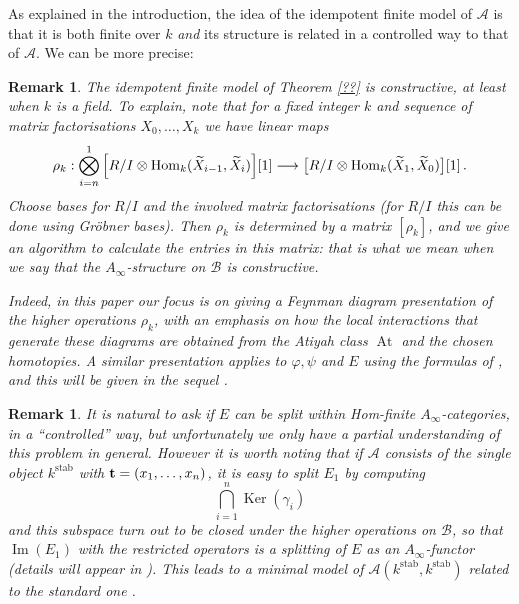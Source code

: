 \documentclass[english,letter paper,12pt,leqno]{article}
\theoremstyle{example}
\newtheorem{remark}[theorem]{Remark}
\numberwithin{equation}{section}
\def\AA{\mathcal{A}}
\def\BB{\mathcal{B}}
\def\Ker{\operatorname{Ker}}
\def\stab{\operatorname{stab}}
\def\Hom{\operatorname{Hom}}
\DeclareMathOperator{\vAt}{At}
\begin{document}
As explained in the introduction, the idea of the idempotent finite model of $\AA$ is that it is both finite over $k$ \emph{and} its structure is related in a controlled way to that of $\AA$. We can be more precise:

\begin{remark}
The idempotent finite model of Theorem \ref{??} is constructive, at least when $k$ is a field. To explain, note that for a fixed integer $k$ and sequence of matrix factorisations $X_0,\ldots,X_k$ we have linear maps
\[
\rho_k: \bigotimes_{i=n}^1 \Big[ R/I \otimes \Hom_k(\widetilde{X}_{i-1}, \widetilde{X}_i) \Big][1] \lto \big[ R/I \otimes \Hom_k( \widetilde{X}_1, \widetilde{X}_0 ) \big][1]\,.
\]
Choose bases for $R/I$ and the involved matrix factorisations (for $R/I$ this can be done using Gr\"obner bases). Then $\rho_k$ is determined by a matrix $[ \rho_k ]$, and we give an algorithm to calculate the entries in this matrix: that is what we mean when we say that the $A_\infty$-structure on $\BB$ is constructive.

Indeed, in this paper our focus is on giving a Feynman diagram presentation of the higher operations $\rho_k$, with an emphasis on how the local interactions that generate these diagrams are obtained from the Atiyah class $\vAt$ and the chosen homotopies. A similar presentation applies to $\varphi, \psi$ and $E$ using the formulas of \cite{markl_transfer}, and this will be given in the sequel \cite{??}.
\end{remark}

\begin{remark}\label{remark:on_generator}
It is natural to ask if $E$ can be split within Hom-finite $A_\infty$-categories, in a ``controlled'' way, but unfortunately we only have a partial understanding of this problem in general. However it is worth noting that if $\AA$ consists of the single object $k^{\stab}$ with $\bold{t} = (x_1,\ldots,x_n)$, it is easy to split $E_1$ by computing
\[
\bigcap_{i=1}^n \Ker(\gamma_i)
\]
and this subspace turn out to be closed under the higher operations on $\BB$, so that $\operatorname{Im}(E_1)$ with the restricted operators is a splitting of $E$ as an $A_\infty$-functor (details will appear in \cite{??}). This leads to a minimal model of $\AA(k^{\stab}, k^{\stab})$ related to the standard one \cite{??,??,??}.
\end{remark}
% 
\end{document}
